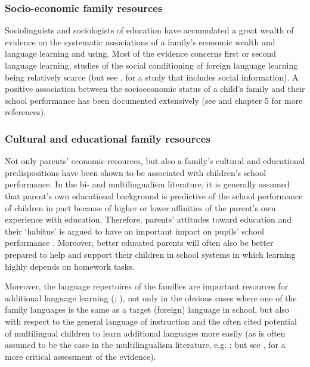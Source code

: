 \documentclass[output=paper]{langscibook}
\begin{document}
\subsubsection{Socio-economic family resources} %

Sociolinguists and sociologists of education have accumulated a great wealth of evidence on the systematic associations of a family’s economic wealth and language learning and using. Most of the evidence concerns first or second language learning, studies of the social conditioning of foreign language learning being relatively scarce (but see \citealt{KliemeDESIKonsortium2008}, for a study that includes social information). A positive association between the socioeconomic status of a child’s family and their school performance has been documented extensively  (see \citealt{EntwisleAlexander1992} and chapter 5 for more references).

\subsubsection{Cultural and educational family resources}  %

Not only parents’ economic resources, but also a family’s cultural and educational predispositions have been shown to be associated with children’s school performance. In the bi- and multilingualism literature, it is generally assumed that parent’s own educational background is predictive of the school performance of children in part because of higher or lower affinities of the parent’s own experience with education. Therefore, parents’ attitudes toward education and their ‘habitus’ is argued to have an important impact on pupils’ school performance \citep{Gogolin1994}. Moreover, better educated parents will often also be better prepared to help and support their children in school systems in which learning highly depends on homework tasks. 

Moreover, the language repertoires of the families are important resources for additional language learning (\citealt{SchepensEtAl2016}; \citealt{SchepensEtAl2020}), not only in the obvious cases where one of the family languages is the same as a target (foreign) language in school, but also with respect to the general language of instruction and the often cited potential of multilingual children to learn additional languages more easily (as is often assumed to be the case in the multilingualism literature, e.g. \citealt{MontanariQuay2019}; but see \citealt{BertheleUdry2019}, for a more critical assessment of the evidence). 
\end{document}

